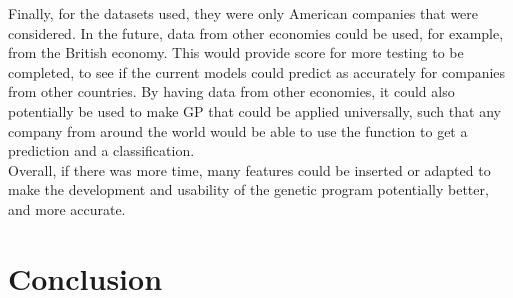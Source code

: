 \documentclass[11pt]{article}
\begin{document}
Finally, for the datasets used, they were only American companies that were considered. In the future, data from other economies could be used, for example, from the British economy. This would provide score for more testing to be completed, to see if the current models could predict as accurately for companies from other countries. By having data from other economies, it could also potentially be used to make GP that could be applied universally, such that any company from around the world would be able to use the function to get a prediction and a classification. \\

Overall, if there was more time, many features could be inserted or adapted to make the development and usability of the genetic program potentially better, and more accurate. 
\newpage
\section{Conclusion}
\end{document}
